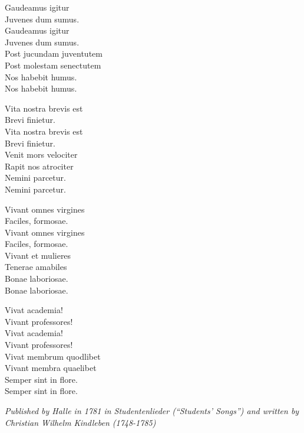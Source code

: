 \vspace{10pt}
Gaudeamus igitur\\
Juvenes dum sumus.\\
Gaudeamus igitur\\
Juvenes dum sumus.\\
Post jucundam juventutem\\
Post molestam senectutem\\
Nos habebit humus.\\
Nos habebit humus.\par
\vspace{10pt}
Vita nostra brevis est\\
Brevi finietur.\\
Vita nostra brevis est\\
Brevi finietur.\\
Venit mors velociter\\
Rapit nos atrociter\\
Nemini parcetur.\\
Nemini parcetur.\par
\newpage
Vivant omnes virgines\\
Faciles, formosae.\\
Vivant omnes virgines\\
Faciles, formosae.\\
Vivant et mulieres\\
Tenerae amabiles\\
Bonae laboriosae.\\
Bonae laboriosae.\par
\vspace{10pt}
Vivat academia!\\
Vivant professores!\\
Vivat academia!\\
Vivant professores!\\
Vivat membrum quodlibet\\
Vivant membra quaelibet\\
Semper sint in flore.\\
Semper sint in flore.\par
\vspace{10pt}
{\footnotesize\textit{Published by Halle in 1781 in Studentenlieder (``Students' Songs'') and written by Christian Wilhelm Kindleben (1748-1785)}}
